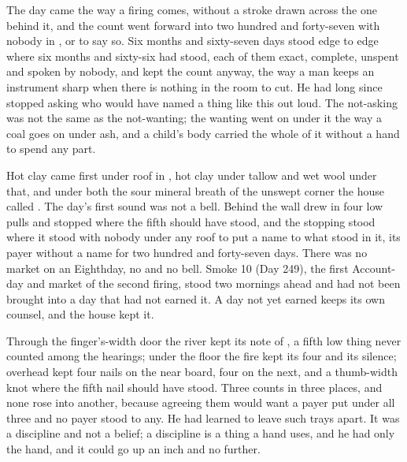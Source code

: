 
The day came the way a firing comes, without a stroke drawn across the one behind it, and the count went forward into two hundred and forty-seven with nobody in ,  or  to say so. Six months and sixty-seven days stood edge to edge where six months and sixty-six had stood, each of them exact, complete, unspent and spoken by nobody, and  kept the count anyway, the way a man keeps an instrument sharp when there is nothing in the room to cut. He had long since stopped asking who would have named a thing like this out loud. The not-asking was not the same as the not-wanting; the wanting went on under it the way a coal goes on under ash, and a child's body carried the whole of it without a hand to spend any part.

Hot clay came first under  roof in , hot clay under tallow and wet wool under that, and under both the sour mineral breath of the unswept corner the house called . The day's first sound was not a bell. Behind the wall  drew in four low pulls and stopped where the fifth should have stood, and the stopping stood where it stood with nobody under any roof to put a name to what stood in it, its payer without a name for two hundred and forty-seven days. There was no market on an Eighthday, no  and no bell. Smoke 10 (Day 249), the first Account-day and market of the second firing, stood two mornings ahead and had not been brought into a day that had not earned it. A day not yet earned keeps its own counsel, and the house kept it.

Through the finger's-width door the river kept its note of , a fifth low thing never counted among the hearings; under the floor the fire kept its four and its silence; overhead  kept four nails on the near board, four on the next, and a thumb-width knot where the fifth nail should have stood. Three counts in three places, and none rose into another, because agreeing them would want a payer put under all three and no payer stood to any. He had learned to leave such trays apart. It was a discipline and not a belief; a discipline is a thing a hand uses, and he had only the hand, and it could go up an inch and no further.

